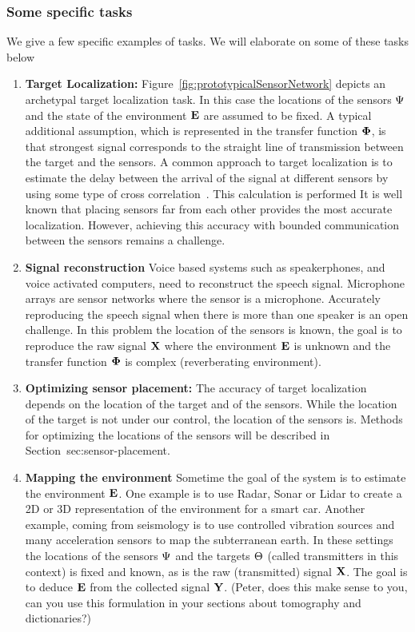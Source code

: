 \subsubsection*{Some specific tasks}
We give a few specific examples of tasks. We will elaborate on some of these tasks below
\begin{enumerate}
    \item {\bf Target Localization:}
      Figure~\ref{fig:prototypicalSensorNetwork} depicts an archetypal
      target localization task. In this case the locations of the
      sensors $\Psi$ and the state of the environment $\mathbf{E}$ are
      assumed to be fixed. A typical additional assumption, which is
      represented in the transfer function $\mathbf{\Phi}$, is that
      strongest signal corresponds to the straight line of
      transmission between the target and the sensors. A common
      approach to target localization is to estimate the delay between
      the arrival of the signal at different sensors by using some
      type of cross correlation~\cite{}. This calculation is performed  
      It is well known that placing sensors far from each other provides the most accurate localization. However, achieving this accuracy with bounded communication between the sensors remains a challenge.
    \item {\bf Signal reconstruction} Voice based systems such as speakerphones, and voice activated computers, need to reconstruct the speech signal. Microphone arrays are sensor networks where the sensor is a microphone. Accurately reproducing the speech signal when there is more than one speaker is an open challenge. In this problem the location of the sensors is known, the goal is to reproduce the raw signal $\mathbf{X}$ where the environment $\mathbf{E}$ is unknown and the transfer function $\mathbf{\Phi}$ is complex (reverberating environment).
    
    
    \item {\bf Optimizing sensor placement:} The accuracy of target localization depends on the location of the target and of the sensors. While the location of the target is not under our control, the location of the sensors is. Methods for optimizing the locations of the sensors will be described in Section~{sec:sensor-placement.}
    
    \item{\bf Mapping the environment} Sometime the goal of the system is to estimate the environment $\mathbf{E}$. One example is to use Radar, Sonar or Lidar to create a 2D or 3D representation of the environment for a smart car. Another example, coming from seismology is to use controlled vibration sources and many acceleration sensors to map the subterranean earth. In these settings the locations of the sensors $\Psi$ and the targets $\Theta$ (called transmitters in this context) is fixed and known, as is the raw (transmitted) signal $\mathbf{X}$. The goal is to deduce $\mathbf{E}$ from the collected signal $\mathbf{Y}$. (Peter, does this make sense to you, can you use this formulation in your sections about tomography and dictionaries?)
    

\end{enumerate}
